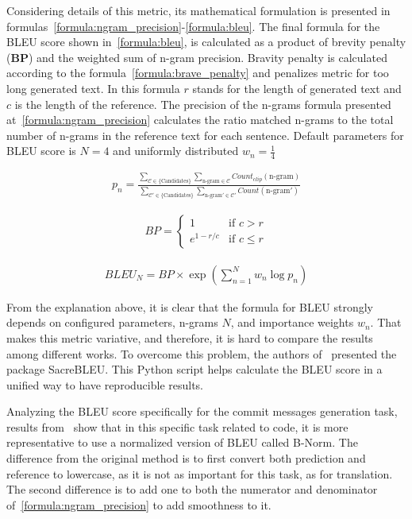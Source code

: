 Considering details of this metric, its mathematical formulation is presented in formulas~\ref{formula:ngram_precision}-\ref{formula:bleu}. The final formula for the BLEU score shown in~\ref{formula:bleu}, is calculated as a product of brevity penalty (\textbf{BP}) and the weighted sum of n-gram precision. Bravity penalty is calculated according to the formula~\ref{formula:brave_penalty} and penalizes metric for too long generated text. In this formula $r$ stands for the length of generated text and $c$ is the length of the reference. The precision of the n-grams formula presented at~\ref{formula:ngram_precision} calculates the ratio matched n-grams to the total number of n-grams in the reference text for each sentence. Default parameters for BLEU score is $N=4$ and uniformly distributed $w_n = \frac{1}{4}$

\begin{align}\label{formula:ngram_precision}
    p_n = \frac{\sum_{\mathcal{C} \in \text{\{Candidates\}}} \sum_{\text{n-gram} \in \mathcal{C}} Count_{clip}(\text{n-gram})}
    {\sum_{\mathcal{C}' \in \text{\{Candidates\}}} \sum_{\text{n-gram}' \in \mathcal{C}'} Count(\text{n-gram}')}
\end{align}

\begin{align}\label{formula:brave_penalty}
    BP = \begin{cases}
        1 & \text{if } c > r \\ 
        e^{1 - r/c} & \text{if } c \leq r
    \end{cases}
\end{align}

\begin{align}\label{formula:bleu}
    BLEU_N = BP \times \exp{\left( \sum_{n=1}^{N} w_n \log p_n\right)}
\end{align}

From the explanation above, it is clear that the formula for BLEU strongly depends on configured parameters, n-grams $N$, and importance weights $w_n$. That makes this metric variative, and therefore, it is hard to compare the results among different works. To overcome this problem, the authors of~\cite{post2018call} presented the package SacreBLEU\@. This Python script helps calculate the BLEU score in a unified way to have reproducible results.

Analyzing the BLEU score specifically for the commit messages generation task, results from~\cite{tao2021evaluation} show that in this specific task related to code, it is more representative to use a normalized version of BLEU called B-Norm. The difference from the original method is to first convert both prediction and reference to lowercase, as it is not as important for this task, as for translation. The second difference is to add one to both the numerator and denominator of~\ref{formula:ngram_precision} to add smoothness to it.

